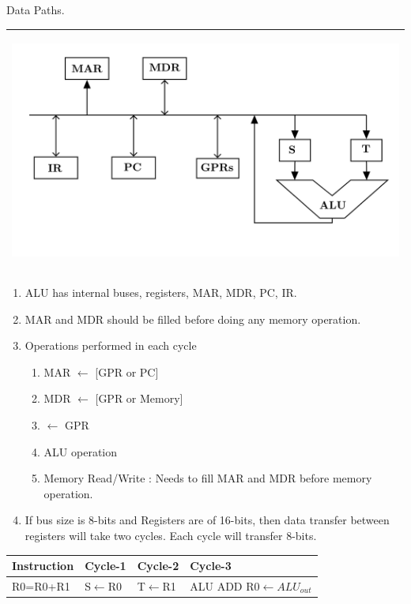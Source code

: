 \begin{enumerate}
    \begin{minipage}{\linewidth}
    \item Data Paths.
          \begin{myTableStyle} \begin{tabular}{ |m{14cm}| } \hline
             \begin{center} \includegraphics[scale=0.2]{./images/data_path_02.jpeg} \end{center}\\ \hline
          \end{tabular} \end{myTableStyle} \vspace{0.08in}
    \begin{enumerate}
      \item ALU has internal buses, registers, MAR, MDR, PC, IR.
      \item MAR and MDR should be filled before doing any memory operation.
      \item Operations performed in each cycle
      \begin{enumerate}
            \item \; MAR \(\leftarrow\) [GPR or PC]
            \item \; MDR \(\leftarrow\) [GPR or  Memory]
            \item \; [S,T] \(\leftarrow\) GPR
            \item \; ALU operation
            \item \; Memory Read/Write : Needs to fill MAR and MDR before memory operation.
      \end{enumerate}
      \item If bus size is 8-bits and Registers are of 16-bits, then data transfer between registers
            will take two cycles. Each cycle will transfer 8-bits.
    \end{enumerate}
      \begin{myTableStyle} \begin{tabular}{ |m{2.5cm}|m{2.5cm}|m{2.1cm}|m{2cm}| } \hline
         Instruction & Cycle-1 & Cycle-2 & Cycle-3  \\ \hline
         R0=R0+R1 & S\(\leftarrow\)R0 & T\(\leftarrow\)R1
                                      & \makecell[l]{ALU ADD \\ R0\(\leftarrow ALU_{out}\)} \\ \hline


\end{tabular}
\end{myTableStyle}
\end{minipage}
\end{enumerate}
